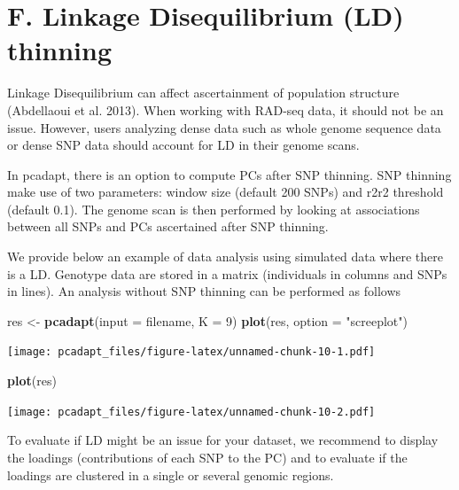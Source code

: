 \documentclass[]{article}
\newenvironment{Shaded}{\begin{snugshade}}{\end{snugshade}}
\newcommand{\KeywordTok}[1]{\textcolor[rgb]{0.13,0.29,0.53}{\textbf{#1}}}
\newcommand{\DataTypeTok}[1]{\textcolor[rgb]{0.13,0.29,0.53}{#1}}
\newcommand{\DecValTok}[1]{\textcolor[rgb]{0.00,0.00,0.81}{#1}}
\newcommand{\FloatTok}[1]{\textcolor[rgb]{0.00,0.00,0.81}{#1}}
\newcommand{\StringTok}[1]{\textcolor[rgb]{0.31,0.60,0.02}{#1}}
\newcommand{\CommentTok}[1]{\textcolor[rgb]{0.56,0.35,0.01}{\textit{#1}}}
\newcommand{\ControlFlowTok}[1]{\textcolor[rgb]{0.13,0.29,0.53}{\textbf{#1}}}
\newcommand{\OperatorTok}[1]{\textcolor[rgb]{0.81,0.36,0.00}{\textbf{#1}}}
\newcommand{\NormalTok}[1]{#1}
\begin{document}
\section{F. Linkage Disequilibrium (LD)
thinning}\label{f.-linkage-disequilibrium-ld-thinning}

Linkage Disequilibrium can affect ascertainment of population structure
(Abdellaoui et al. 2013). When working with RAD-seq data, it should not
be an issue. However, users analyzing dense data such as whole genome
sequence data or dense SNP data should account for LD in their genome
scans.

In pcadapt, there is an option to compute PCs after SNP thinning. SNP
thinning make use of two parameters: window size (default 200 SNPs) and
r2r2 threshold (default 0.1). The genome scan is then performed by
looking at associations between all SNPs and PCs ascertained after SNP
thinning.

We provide below an example of data analysis using simulated data where
there is a LD. Genotype data are stored in a matrix (individuals in
columns and SNPs in lines). An analysis without SNP thinning can be
performed as follows

\begin{Shaded}
\begin{Highlighting}[]
\NormalTok{res <-}\StringTok{ }\KeywordTok{pcadapt}\NormalTok{(}\DataTypeTok{input =}\NormalTok{ filename, }\DataTypeTok{K =} \DecValTok{9}\NormalTok{)}
\KeywordTok{plot}\NormalTok{(res, }\DataTypeTok{option =} \StringTok{"screeplot"}\NormalTok{)}
\end{Highlighting}
\end{Shaded}

\texttt{[image: pcadapt\_files/figure-latex/unnamed-chunk-10-1.pdf]}

\begin{Shaded}
\begin{Highlighting}[]
\KeywordTok{plot}\NormalTok{(res)}
\end{Highlighting}
\end{Shaded}

\texttt{[image: pcadapt\_files/figure-latex/unnamed-chunk-10-2.pdf]}

To evaluate if LD might be an issue for your dataset, we recommend to
display the loadings (contributions of each SNP to the PC) and to
evaluate if the loadings are clustered in a single or several genomic
regions.

\begin{Shaded}
\end{Shaded}
\end{document}
